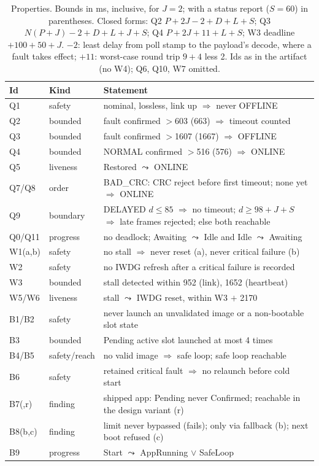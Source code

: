 \documentclass[conference,a4paper]{IEEEtran}
\begin{document}
\begin{table}[t]
\centering\footnotesize
\caption{Properties. Bounds in ms, inclusive, for $J{=}2$; with a status report ($S{=}60$) in parentheses. Closed forms: Q2 $P{+}2J{-}2{+}D{+}L{+}S$; Q3 $N(P{+}J){-}2{+}D{+}L{+}J{+}S$; Q4 $P{+}2J{+}11{+}L{+}S$; W3 deadline${+}100{+}50{+}J$. $-2$: least delay from poll stamp to the payload's decode, where a fault takes effect; $+11$: worst-case round trip $9{+}4$ less 2. Ids as in the artifact (no W4); Q6, Q10, W7 omitted.}
\label{tab:props}
\setlength{\tabcolsep}{4pt}
\begin{tabularx}{\columnwidth}{@{}l l >{\raggedright\arraybackslash}X@{}}
\toprule
Id & Kind & Statement \\
\midrule
Q1 & safety & nominal, lossless, link up $\Rightarrow$ never OFFLINE \\
Q2 & bounded & fault confirmed $>$603 (663) $\Rightarrow$ timeout counted \\
Q3 & bounded & fault confirmed $>$1607 (1667) $\Rightarrow$ OFFLINE \\
Q4 & bounded & NORMAL confirmed $>$516 (576) $\Rightarrow$ ONLINE \\
Q5 & liveness & Restored $\leadsto$ ONLINE \\
Q7/Q8 & order & BAD\_CRC: CRC reject before first timeout; none yet $\Rightarrow$ ONLINE \\
Q9 & boundary & DELAYED $d{\le}85$ $\Rightarrow$ no timeout; $d{\ge}98{+}J{+}S$ $\Rightarrow$ late frames rejected; else both reachable \\
Q0/Q11 & progress & no deadlock; Awaiting $\leadsto$ Idle and Idle $\leadsto$ Awaiting \\
W1(a,b) & safety & no stall $\Rightarrow$ never reset (a), never critical failure (b) \\
W2 & safety & no IWDG refresh after a critical failure is recorded \\
W3 & bounded & stall detected within 952 (link), 1652 (heartbeat) \\
W5/W6 & liveness & stall $\leadsto$ IWDG reset, within W3 ${+}$ 2170 \\
B1/B2 & safety & never launch an unvalidated image or a non-bootable slot state \\
B3 & bounded & Pending active slot launched at most 4 times \\
B4/B5 & safety/reach & no valid image $\Rightarrow$ safe loop; safe loop reachable \\
B6 & safety & retained critical fault $\Rightarrow$ no relaunch before cold start \\
B7(,r) & finding & shipped app: Pending never Confirmed; reachable in the design variant (r) \\
B8(b,c) & finding & limit never bypassed (fails); only via fallback (b); next boot refused (c) \\
B9 & progress & Start $\leadsto$ AppRunning $\lor$ SafeLoop \\
\bottomrule
\end{tabularx}
\end{table}
\end{document}

